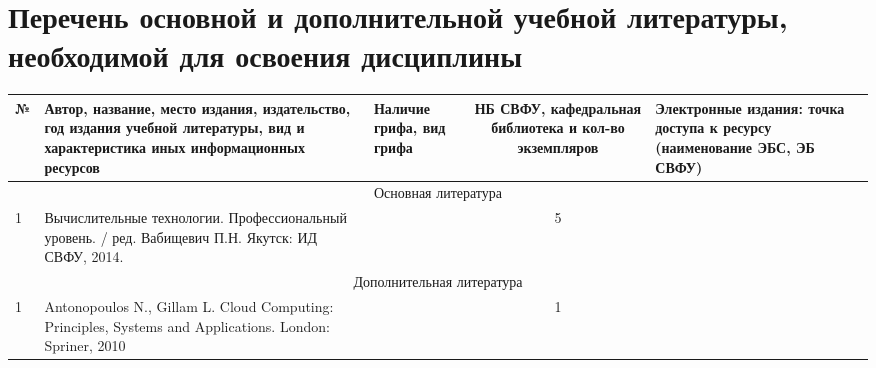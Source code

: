\documentclass[a4paper,12pt]{article}
\begin{document}
\newpage
\section{Перечень основной и дополнительной учебной литературы, необходимой для освоения дисциплины}

  \begin{table}[H]
  \caption*{Перечень литературы}
  \begin{longtable}{|l|p{7cm}|p{18mm}|c|p{32mm}|}
  \hline
  № & 
  \centering\small\arraybackslash Автор, название, место издания, издательство, год издания учебной литературы, вид и характеристика иных информационных ресурсов &
  \multicolumn{1}{p{18mm}|}{\centering\small\arraybackslash Наличие грифа, вид грифа} &
  \multicolumn{1}{p{21mm}|}{\centering\small\arraybackslash НБ СВФУ, кафедральная библиотека и кол-во экземпляров} & 
  \centering\small\arraybackslash Электронные издания: точка доступа к ресурсу (наименование ЭБС, ЭБ СВФУ)\\
  \hline
  \multicolumn{5}{|c|}{Основная литература}\\
  \hline
  1 &\raggedright\arraybackslash Вычислительные технологии. Профессиональный уровень. / ред. Вабищевич П.Н. Якутск: ИД СВФУ, 2014.  &   &  5  &  
  \\
  \hline
  
  \multicolumn{5}{|c|}{Дополнительная литература}\\
  \hline
  1 &\raggedright\arraybackslash Antonopoulos N., Gillam L. Cloud Computing: Principles, Systems and Applications. London: Spriner, 2010  &   &  1  &  
  \\
  \hline
  
  \end{longtable}
  \end{table}
  
\end{document}
